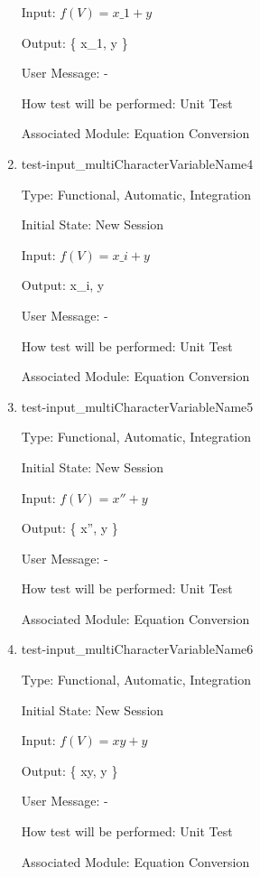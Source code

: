 \documentclass[12pt, titlepage]{article}
\begin{document}
\begin{enumerate}
	Input: $f(V) = x\_1 + y$
	
	Output: \{ x\_1, y \}
	
	User Message: - 
	
	How test will be performed: Unit Test
	
	Associated Module: Equation Conversion\\
	
	\item{test-input\_multiCharacterVariableName4}
	
	Type: Functional, Automatic, Integration
	
	Initial State: New Session
	
	Input: $f(V) = x\_i + y$
	
	Output: { x\_i, y }
	
	User Message: - 
	
	How test will be performed: Unit Test
	
	Associated Module: Equation Conversion\\
	
	\item{test-input\_multiCharacterVariableName5}
	
	Type: Functional, Automatic, Integration
	
	Initial State: New Session
	
	Input: $f(V) = x'' + y$
	
	Output: \{ x'', y \}
	
	User Message: - 
	
	How test will be performed: Unit Test
	
	Associated Module: Equation Conversion\\
	
	\item{test-input\_multiCharacterVariableName6}
	
	Type: Functional, Automatic, Integration
	
	Initial State: New Session
	
	Input: $f(V) = xy + y$
	
	Output: \{ xy, y \}
	
	User Message: - 
	
	How test will be performed: Unit Test
	
	Associated Module: Equation Conversion\\
	
%	
%	
%	
%	
%	
%	
	
\end{enumerate}
\end{document}
